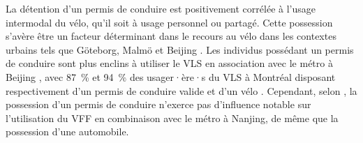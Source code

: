 \begin{refsegment}
La détention d'un permis de conduire est positivement corrélée à l'usage intermodal du vélo, qu'il soit à usage personnel ou partagé. Cette possession s'avère être un facteur déterminant dans le recours au vélo dans les contextes urbains tels que Göteborg, Malmö et Beijing \textcolor{blue}{\autocite[7]{hamidi_shaping_2020}}. Les individus possédant un permis de conduire sont plus enclins à utiliser le \acrshort{VLS} en association avec le métro à Beijing \textcolor{blue}{\autocite[215]{lin_built_2018}}, avec 87~\% et 94~\% des usager·ère·s du \acrshort{VLS} à Montréal disposant respectivement d'un permis de conduire valide et d'un vélo \textcolor{blue}{\autocite[111]{bachand-marleau_much-anticipated_2011}}. Cependant, selon \textcolor{blue}{\textcite[11]{liu_use_2020}}, la possession d'un permis de conduire n'exerce pas d'influence notable sur l'utilisation du \acrshort{VFF} en combinaison avec le métro à Nanjing, de même que la possession d'une automobile.%


\end{refsegment}
